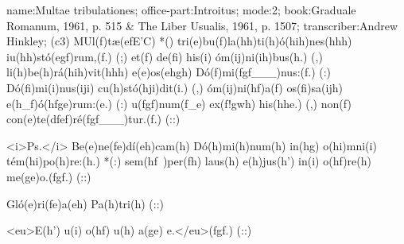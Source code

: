 name:Multae tribulationes;
office-part:Introitus;
mode:2;
book:Graduale Romanum, 1961, p. 515 & The Liber Usualis, 1961, p. 1507;
transcriber:Andrew Hinkley;
(c3) MUl(f)tæ(efE'C) *() tri(e)bu(f)la(hh)ti(h)ó(hih)nes(hhh) iu(hh)stó(egf)rum,(f.) (;) et(f) de(fi) his(i) óm(ij)ni(ih)bus(h.) (,) li(h)be(h)rá(hih)vit(hhh) e(e)os(ehgh) Dó(f)mi(fgf___)nus:(f.) (:) Dó(fi)mi(i)nus(iji) cu(h)stó(hji)dit(i.) (,) óm(ij)ni(hf)a(f) os(fi)sa(ijh) e(h_f)ó(hfge)rum:(e.) (:) u(fgf)num(f_e) ex(f!gwh) his(hhe.) (,) non(f) con(e)te(dfef)ré(fgf___)tur.(f.) (::)

<i>Ps.</i>
Be(e)ne(fe)dí(eh)cam(h) Dó(h)mi(h)num(h) in(hg) o(hi)mni(i) tém(hi)po(h)re:(h.) *(:) sem(hf~)per(fh) laus(h) e(h)jus(h') in(i) o(hf)re(h) me(ge)o.(fgf.) (::)

Gló(e)ri(fe)a(eh) Pa(h)tri(h) (::)

<eu>E(h') u(i) o(hf) u(h) a(ge) e.</eu>(fgf.) (::)
